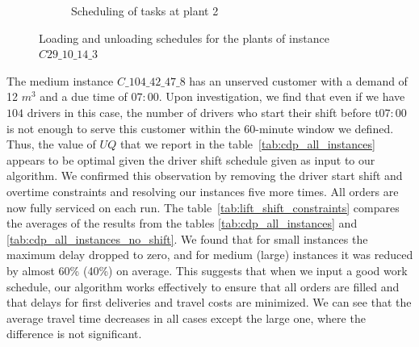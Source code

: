 \begin{figure}[htb]
\begin{subfigure}{\textwidth}
        \vspace*{-3em}
        \caption{Scheduling of tasks at plant  2}
        \label{fig:plant2}
    \end{subfigure}

    \caption{Loading and unloading schedules for the plants of instance $C29\_10\_14\_3$}
    \label{fig:plants_schedules}
\end{figure}

The medium instance $C\_104\_42\_47\_8$ has an unserved customer with a demand of 12 $m^3$ and a due time of $07:00$. Upon investigation, we find that even if we have $104$ drivers in this case, the number of drivers who start their shift before t$07:00$ is not enough to serve this customer within the 60-minute window we defined. Thus, the value of $UQ$ that we report in the table~\ref{tab:cdp_all_instances} appears to be optimal given the driver shift schedule given as input to our algorithm. We confirmed this observation by removing the driver start shift and overtime constraints and resolving our instances five more times. All orders are now fully serviced on each run. The table~\ref{tab:lift_shift_constraints} compares the averages of the results from  the tables \ref{tab:cdp_all_instances} and \ref{tab:cdp_all_instances_no_shift}. We found that for small instances the maximum delay dropped to zero, and for medium (large) instances it was reduced by almost 60\% (40\%) on average. This suggests that when we input a good work schedule, our algorithm works effectively to ensure that all orders are filled and that delays for first deliveries and travel costs are minimized. We can see that the average travel time decreases in all cases except the large one, where the difference is not significant.

\begin{table}[!ht]
    \centering
    \small
    \caption{Comparison of the average results with and without shift and overtime constraints}
    \label{tab:lift_shift_constraints}
\end{table}
    

